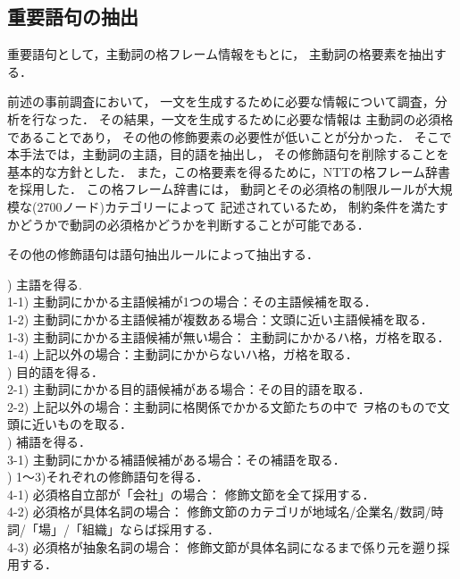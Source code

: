 \clearpage
\subsection{重要語句の抽出}
重要語句として，主動詞の格フレーム情報をもとに，
主動詞の格要素を抽出する．

前述の事前調査において，
一文を生成するために必要な情報について調査，分析を行なった．
その結果，一文を生成するために必要な情報は
主動詞の必須格であることであり，
その他の修飾要素の必要性が低いことが分かった．
そこで本手法では，主動詞の主語，目的語を抽出し，
その修飾語句を削除することを基本的な方針とした．
また，この格要素を得るために，NTTの格フレーム辞書を採用した．
この格フレーム辞書には，
動詞とその必須格の制限ルールが大規模な(2700ノード)カテゴリーによって
記述されているため，
制約条件を満たすかどうかで動詞の必須格かどうかを判断することが可能である．

その他の修飾語句は語句抽出ルールによって抽出する．\\

\begin{indention}{4mm}
) 主語を得る.\\
1-1) 主動詞にかかる主語候補が1つの場合：その主語候補を取る．\\
1-2) 主動詞にかかる主語候補が複数ある場合：文頭に近い主語候補を取る．\\
1-3) 主動詞にかかる主語候補が無い場合： 主動詞にかかるハ格，ガ格を取る．\\
1-4) 上記以外の場合：主動詞にかからないハ格，ガ格を取る．\\

) 目的語を得る．\\
2-1) 主動詞にかかる目的語候補がある場合：その目的語を取る．\\
2-2) 上記以外の場合：主動詞に格関係でかかる文節たちの中で
ヲ格のもので文頭に近いものを取る．\\

) 補語を得る．\\
3-1) 主動詞にかかる補語候補がある場合：その補語を取る．\\

) 1〜3)それぞれの修飾語句を得る．\\
4-1) 必須格自立部が「会社」の場合： 修飾文節を全て採用する．\\
4-2) 必須格が具体名詞の場合：
修飾文節のカテゴリが地域名/企業名/数詞/時詞/「場」/「組織」ならば採用する．\\
4-3) 必須格が抽象名詞の場合：
修飾文節が具体名詞になるまで係り元を遡り採用する．\\ 
\end{indention}


